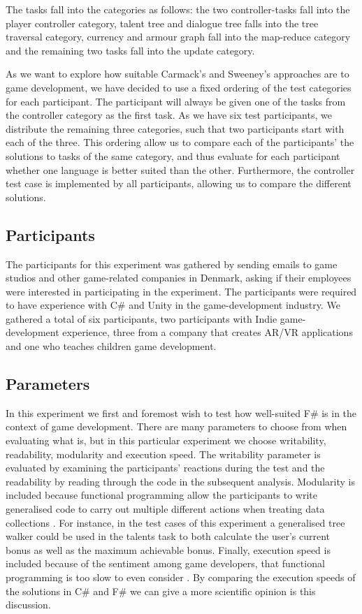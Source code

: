 The tasks fall into the categories as follows: the two controller-tasks fall into the player controller category, talent tree and dialogue tree falls into the tree traversal category, currency and armour graph fall into the map-reduce category and the remaining two tasks fall into the  update category.

As we want to explore how suitable Carmack's and Sweeney's approaches are to game development, we have decided to use a fixed ordering of the test categories for each participant. The participant will always be given one of the tasks from the controller category as the first task. As we have six test participants, we distribute the remaining three categories, such that two participants start with each of the three. This ordering allow us to compare each of the participants' the solutions to tasks of the same category, and thus evaluate for each participant whether one language is better suited than the other. Furthermore, the controller test case is implemented by all participants, allowing us to compare the different solutions.

\subsection{Participants}
The participants for this experiment was gathered by sending emails to game studios and other game-related companies in Denmark, asking if their employees were interested in participating in the experiment. The participants were required to have experience with C\# and Unity in the game-development industry. We gathered a total of six participants, two participants with Indie game-development experience, three from a company that creates \gls{AR}/\gls{VR} applications and one who teaches children game development.

\subsection{Parameters}
In this experiment we first and foremost wish to test how well-suited F\# is in the context of game development. There are many parameters to choose from when evaluating what \textit{} is, but in this particular experiment we choose writability, readability, modularity and execution speed. The writability parameter is evaluated by examining the participants' reactions during the test and the readability by reading through the code in the subsequent analysis. Modularity is included because functional programming allow the participants to write generalised code to carry out multiple different actions when treating data collections \cite{hughes1989functional}. For instance, in the test cases of this experiment a generalised tree walker could be used in the talents task to both calculate the user's current bonus as well as the maximum achievable bonus. Finally, execution speed is included because of the sentiment among game developers, that functional programming is too slow to even consider \cite{pop:functional:slow, pop:functional:sucks}. By comparing the execution speeds of the solutions in C\# and F\# we can give a more scientific opinion is this discussion.

